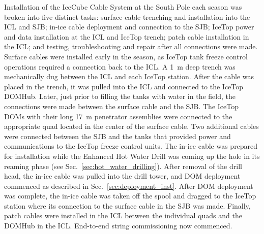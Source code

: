 Installation of the IceCube Cable System at the South Pole each season was
broken into five distinct tasks: surface cable trenching and
installation into the ICL and SJB; in-ice cable deployment and
connection to the SJB; IceTop power and data installation at the ICL and
IceTop trench; patch cable installation in the ICL; and testing,
troubleshooting and repair after all connections were made. Surface cables
were installed early in the season, as IceTop tank freeze control operations
required a connection back to the ICL. A 1~m deep trench was mechanically
dug between the ICL and each IceTop station. After the cable was placed in
the trench, it was pulled into the ICL and connected to the IceTop
DOMHub. Later, just prior to filling the tanks with water in the field, the
connections were made between the surface cable and the SJB. The IceTop
DOMs with their long 17~m penetrator assemblies were connected to the
appropriate quad located in the center of the surface cable. Two additional
cables were connected between the SJB and the tanks that provided power and
communications to the IceTop freeze control units. The in-ice cable
was prepared for installation while the Enhanced Hot Water Drill was coming
up the hole in its reaming phase (see
Sec.~\ref{sec:hot_water_drilling}). After removal of the drill head, the 
in-ice cable was pulled into the drill tower, and DOM deployment
commenced as described in Sec.~\ref{sec:deployment_inst}. After DOM
deployment was complete, the in-ice cable was taken off the spool and
dragged to the IceTop station where its connection to the surface cable in the SJB was
made. Finally, patch cables were installed in the ICL between the
individual quads and the DOMHub in the ICL. End-to-end string commissioning
now commenced.
